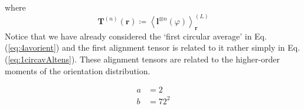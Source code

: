 where
\begin{equation}
\mathbf{T}^{(n)}\left( \boldsymbol{r} \right)\coloneqq\left\langle \boldsymbol{l}^{\otimes n}(\varphi) \right\rangle_{\boldsymbol{r}}^{(L)}\label{eq:10alignDef}
\end{equation}
Notice that we have already considered the `first circular average' in Eq. (\ref{eq:4avorient}) and the first alignment tensor is related to it rather simply in Eq. (\ref{eq:1circavAltens}). These alignment tensors are related to the higher-order moments of the orientation distribution.  %

\begin{align}
    a&= 2\\
    b&= 72^2
\end{align}


